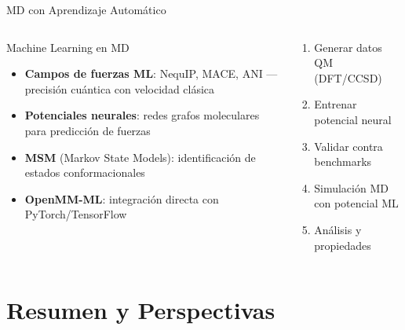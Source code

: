 \documentclass[aspectratio=169, 10pt]{beamer}
\begin{document}
\begin{frame}{MD con Aprendizaje Automático}
\begin{columns}[T]
\begin{block}{Machine Learning en MD}
  \begin{itemize}
    \item \textbf{Campos de fuerzas ML}: NequIP, MACE, ANI — precisión cuántica con velocidad clásica
    \item \textbf{Potenciales neurales}: redes grafos moleculares para predicción de fuerzas
    \item \textbf{MSM} (Markov State Models): identificación de estados conformacionales
    \item \textbf{OpenMM-ML}: integración directa con PyTorch/TensorFlow
  \end{itemize}
\end{block}

\begin{tcolorbox}[warningbox, title={Flujo ML-MD}]
\small
\begin{enumerate}
  \item Generar datos QM (DFT/CCSD)
  \item Entrenar potencial neural
  \item Validar contra benchmarks
  \item Simulación MD con potencial ML
  \item Análisis y propiedades
\end{enumerate}
\end{tcolorbox}
\end{columns}
\end{frame}

\section{Resumen y Perspectivas}
\end{document}
